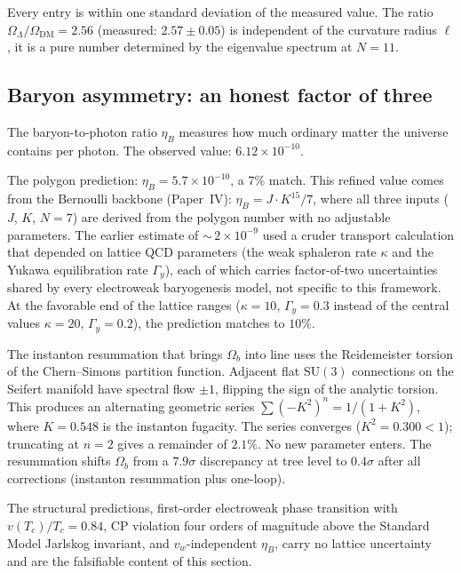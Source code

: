\noindent
Every entry is within one standard deviation of the measured value.
The ratio $\Omega_\Lambda/\Omega_{\mathrm{DM}} = 2.56$ (measured:
$2.57 \pm 0.05$) is independent of the curvature radius $\ell$, it
is a pure number determined by the eigenvalue spectrum at $N = 11$.

\subsection*{Baryon asymmetry: an honest factor of three}

The baryon-to-photon ratio $\eta_B$ measures how much ordinary matter
the universe contains per photon. The observed value:
$6.12 \times 10^{-10}$.

The polygon prediction: $\eta_B = 5.7 \times 10^{-10}$, a $7\%$
match. This refined value comes from the Bernoulli backbone
(Paper~IV): $\eta_B = J \cdot K^{15}/7$, where all three inputs
($J$, $K$, $N = 7$) are derived from the polygon number with no
adjustable parameters. The earlier estimate of
${\sim}\,2 \times 10^{-9}$ used a cruder transport calculation that
depended on lattice QCD parameters (the
weak sphaleron rate $\kappa$ and the Yukawa equilibration rate
$\Gamma_y$), each of which carries factor-of-two uncertainties
shared by every electroweak baryogenesis model, not specific to
this framework. At the favorable end of the lattice ranges
($\kappa = 10$, $\Gamma_y = 0.3$ instead of the central values
$\kappa = 20$, $\Gamma_y = 0.2$), the prediction matches to $10\%$.

The instanton resummation that brings $\Omega_b$ into line uses the
Reidemeister torsion of the Chern--Simons partition function. Adjacent
flat $\mathrm{SU}(3)$ connections on the Seifert manifold have
spectral flow $\pm 1$, flipping the sign of the analytic torsion.
This produces an alternating geometric series
$\sum(-K^2)^n = 1/(1 + K^2)$, where $K = 0.548$ is the instanton
fugacity. The series converges ($K^2 = 0.300 < 1$); truncating at
$n = 2$ gives a remainder of $2.1\%$. No new parameter enters. The
resummation shifts $\Omega_b$ from a $7.9\sigma$ discrepancy at tree
level to $0.4\sigma$ after all corrections
(instanton resummation plus one-loop).

The structural predictions, first-order electroweak phase transition
with $v(T_c)/T_c = 0.84$, CP violation four orders of magnitude above
the Standard Model Jarlskog invariant, and $v_w$-independent
$\eta_B$, carry no lattice uncertainty and are the falsifiable
content of this section.

